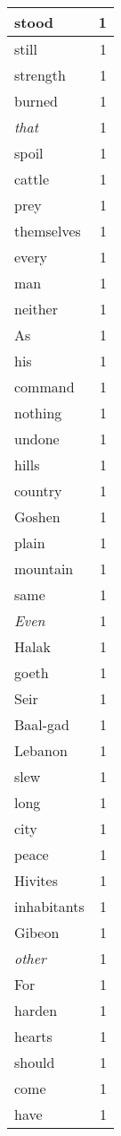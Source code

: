 \begin{center}
\begin{longtable}{l|r}
stood & 1 \\ \hline
still & 1 \\ \hline
strength & 1 \\ \hline
burned & 1 \\ \hline
\emph{that} & 1 \\ \hline
spoil & 1 \\ \hline
cattle & 1 \\ \hline
prey & 1 \\ \hline
themselves & 1 \\ \hline
every & 1 \\ \hline
man & 1 \\ \hline
neither & 1 \\ \hline
As & 1 \\ \hline
his & 1 \\ \hline
command & 1 \\ \hline
nothing & 1 \\ \hline
undone & 1 \\ \hline
hills & 1 \\ \hline
country & 1 \\ \hline
Goshen & 1 \\ \hline
plain & 1 \\ \hline
mountain & 1 \\ \hline
same & 1 \\ \hline
\emph{Even} & 1 \\ \hline
Halak & 1 \\ \hline
goeth & 1 \\ \hline
Seir & 1 \\ \hline
Baal-gad & 1 \\ \hline
Lebanon & 1 \\ \hline
slew & 1 \\ \hline
long & 1 \\ \hline
city & 1 \\ \hline
peace & 1 \\ \hline
Hivites & 1 \\ \hline
inhabitants & 1 \\ \hline
Gibeon & 1 \\ \hline
\emph{other} & 1 \\ \hline
For & 1 \\ \hline
harden & 1 \\ \hline
hearts & 1 \\ \hline
should & 1 \\ \hline
come & 1 \\ \hline
have & 1 \\ \hline

\end{longtable}
\end{center}
